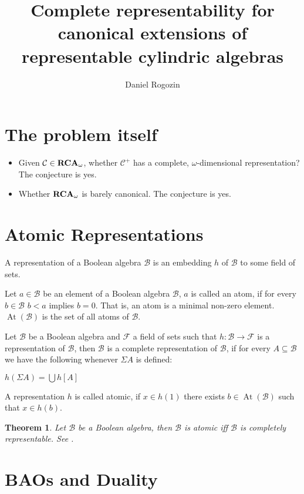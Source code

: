 \documentclass[a4paper]{article}
\author{Daniel Rogozin}
\date{}
\title{Complete representability for canonical extensions of representable cylindric algebras}
\theoremstyle{defin}
\theoremstyle{theorem}
\newtheorem{theorem}{Theorem}
\theoremstyle{prop}
\theoremstyle{lemma}
\theoremstyle{fact}
\theoremstyle{ex}
\theoremstyle{col}
\begin{document}
\maketitle

\section{The problem itself}

\begin{itemize}
\item Given $\mathcal{C} \in {\bf RCA}_{\omega}$, whether $\mathcal{C}^{+}$ has a complete, $\omega$-dimensional representation? The conjecture is yes. \cite{hirsch2002relation}
\item Whether ${\bf RCA}_{\omega}$ is barely canonical. The conjecture is yes.
\end{itemize}
\section{Atomic Representations}

A representation of a Boolean algebra $\mathcal{B}$ is an embedding $h$ of $\mathcal{B}$ to some field of sets.

Let $a \in \mathcal{B}$ be an element of a Boolean algebra $\mathcal{B}$, $a$ is called an atom, if for every $b \in \mathcal{B}$
$b < a$ implies $b = 0$. That is, an atom is a minimal non-zero element. $\operatorname{At}(\mathcal{B})$ is the set of all atoms
of $\mathcal{B}$.

Let $\mathcal{B}$ be a Boolean algebra and $\mathcal{F}$ a field of sets such that $h : \mathcal{B} \to \mathcal{F}$ is a
representation of $\mathcal{B}$, then $\mathcal{B}$ is a complete representation of $\mathcal{B}$, if for every
$A \subseteq \mathcal{B}$ we have the following whenever $\Sigma A$ is defined:
\begin{center}
  $h(\Sigma A) = \bigcup h[A]$
\end{center}

A representation $h$ is called atomic, if $x \in h(1)$ there exists $b \in \operatorname{At}(\mathcal{B})$ such that $x \in h(b)$.

\begin{theorem} \label{completeboolean}
  Let $\mathcal{B}$ be a Boolean algebra, then $\mathcal{B}$ is atomic iff $\mathcal{B}$ is completely representable. See \cite[Corollary 6]{hirsch1997complete}.
\end{theorem}

\section{BAOs and Duality}
\end{document}
